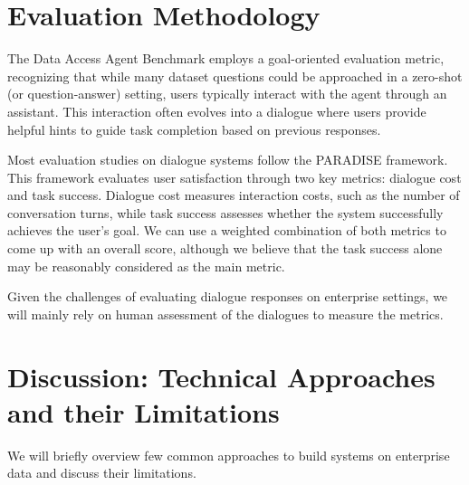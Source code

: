 \documentclass[11pt,a4paper]{article}
\begin{document}

\section{Evaluation Methodology}

The Data Access Agent Benchmark employs a goal-oriented evaluation metric\cite{goal-oriented}, recognizing that while many dataset questions could be approached in a zero-shot (or question-answer) setting, users typically interact with the agent through an assistant. This interaction often evolves into a dialogue where users provide helpful hints to guide task completion based on previous responses.

Most evaluation studies on dialogue systems follow the PARADISE\cite{paradise} framework. This framework evaluates user satisfaction through two key metrics: dialogue cost and task success. Dialogue cost measures interaction costs, such as the number of conversation turns, while task success assesses whether the system successfully achieves the user's goal. We can use a weighted combination of both metrics to come up with an overall score, although we believe that the task success alone may be reasonably considered as the main metric.

Given the challenges of evaluating dialogue responses on enterprise settings\cite{ham2023challenges}, we will mainly rely on human assessment of the dialogues to measure the metrics.

\section{Discussion: Technical Approaches and their Limitations}

We will briefly overview few common approaches to build systems on enterprise data and discuss their limitations.
\end{document}
